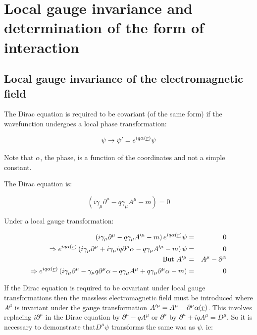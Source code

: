 \chapter[{Local gauge invariance and the form of interaction}]{Local gauge invariance and determination of the form of interaction}

\section{Local gauge invariance of the electromagnetic field}

The Dirac equation is required to be covariant (of the same form) if the wavefunction undergoes a local phase transformation:

\[
  \psi \to \psi' = e^{iq\alpha(\underline{r})}\psi
\]

Note that $\alpha$, the phase, is a function of the coordinates and not a simple constant.

The Dirac equation is:

\[
  \left(i\gamma_{\mu}\partial^{\mu} - q\gamma_{\mu}A^{\mu} - m\right) = 0
\]

Under a local gauge transformation:

\begin{eqnarray*}
  \left(i\gamma_{\mu}\partial^{\mu} - q\gamma_{\mu}A'^{\mu} - m\right)e^{iq\alpha(\underline{r})}\psi & = & 0 \\
  \Rightarrow e^{iq\alpha(\underline{r})}\left(i\gamma_{\mu}\partial^{\mu} + i \gamma_{\mu}iq\partial^{\mu}\alpha - q\gamma_{\mu}A'^{\mu} - m\right)\psi & = & 0 \\
  \textrm{But } A'^{\mu} & = & A^{\mu} - \partial^{\alpha} \\
  \Rightarrow e^{iq\alpha(\underline{r})}\left(i\gamma_{\mu}\partial^{\mu} - \gamma_{\mu}q\partial^{\mu}\alpha - q\gamma_{\mu}A^{\mu} + q\gamma_{\mu}\partial^{\mu}\alpha - m\right) & = & 0
\end{eqnarray*}

If the Dirac equation is required to be covariant under local gauge transformations then the massless electromagnetic field must be introduced where $A^{\mu}$ is invariant under the gauge transformation $A'^{\mu} = A^{\mu} - \partial^{\mu}\alpha(\underline{r})$.  This involves replacing $i\partial^{\mu}$ in the Dirac equation by $\partial^{\mu} - qA^{\mu}$ or $\partial^{\mu}$ by $\partial^{\mu} + iqA^{\mu} = D^{\mu}$.  So it is necessary to demonstrate that$D^{\mu}\psi$ transforms the same was as $\psi$.  ie:

